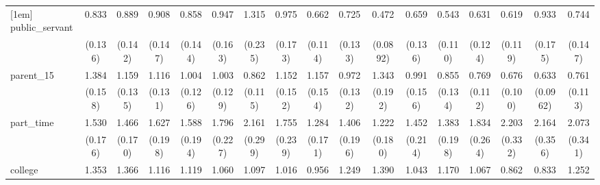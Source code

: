 {\begin{tabular}{l*{16}{c}}
[1em]
public\_servant      &       0.833         &       0.889         &       0.908         &       0.858         &       0.947         &       1.315         &       0.975         &       0.662\sym{*}  &       0.725         &       0.472\sym{***}&       0.659\sym{*}  &       0.543\sym{**} &       0.631\sym{*}  &       0.619\sym{*}  &       0.933         &       0.744         \\
                    &     (0.136)         &     (0.142)         &     (0.147)         &     (0.144)         &     (0.163)         &     (0.235)         &     (0.173)         &     (0.114)         &     (0.133)         &    (0.0892)         &     (0.136)         &     (0.110)         &     (0.124)         &     (0.119)         &     (0.175)         &     (0.147)         \\
[1em]
parent\_15           &       1.384\sym{**} &       1.159         &       1.116         &       1.004         &       1.003         &       0.862         &       1.152         &       1.157         &       0.972         &       1.343\sym{*}  &       0.991         &       0.855         &       0.769         &       0.676\sym{**} &       0.633\sym{**} &       0.761         \\
                    &     (0.158)         &     (0.135)         &     (0.131)         &     (0.126)         &     (0.129)         &     (0.115)         &     (0.152)         &     (0.154)         &     (0.132)         &     (0.192)         &     (0.156)         &     (0.134)         &     (0.112)         &     (0.100)         &    (0.0962)         &     (0.113)         \\
[1em]
part\_time           &       1.530\sym{***}&       1.466\sym{**} &       1.627\sym{***}&       1.588\sym{***}&       1.796\sym{***}&       2.161\sym{***}&       1.755\sym{***}&       1.284         &       1.406\sym{*}  &       1.222         &       1.452\sym{*}  &       1.383\sym{*}  &       1.834\sym{***}&       2.203\sym{***}&       2.164\sym{***}&       2.073\sym{***}\\
                    &     (0.176)         &     (0.170)         &     (0.198)         &     (0.194)         &     (0.227)         &     (0.299)         &     (0.239)         &     (0.171)         &     (0.196)         &     (0.180)         &     (0.214)         &     (0.198)         &     (0.264)         &     (0.332)         &     (0.356)         &     (0.341)         \\
[1em]
college             &       1.353\sym{*}  &       1.366\sym{*}  &       1.116         &       1.119         &       1.060         &       1.097         &       1.016         &       0.956         &       1.249         &       1.390\sym{*}  &       1.043         &       1.170         &       1.067         &       0.862         &       0.833         &       1.252         \\

\end{tabular}}

